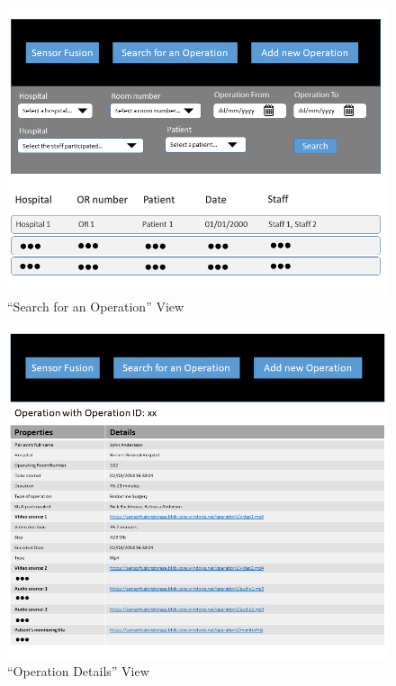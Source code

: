 \begin{figure}[h]
\begin{center}
\includegraphics[width=17cm]{imgs/Search_For_Operation.png}
\end{center}\vspace{-0.3cm}
\caption[``Search for an Operation'' View]{``Search for an Operation'' View} \label{View-Search}
\end{figure}

\begin{figure}[h]
\begin{center}
\includegraphics[width=17cm]{imgs/Operation_Details.png}
\end{center}\vspace{-0.3cm}
\caption[``Operation Details'' View]{``Operation Details'' View} \label{View-Details}
\end{figure}


